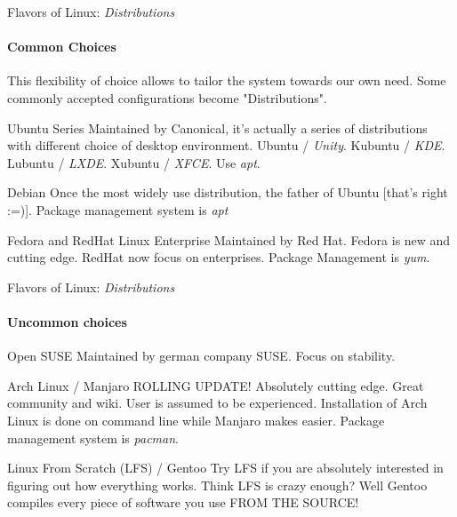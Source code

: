 \begin{frame}{Flavors of Linux: \textit{Distributions}}
\framesubtitle{Common Choices}
\begin{small}
	This flexibility of choice allows to tailor the system towards our own need. Some commonly accepted configurations become "Distributions".
\end{small} 
\begin{block}{Ubuntu Series}
	Maintained by Canonical, it's actually a series of distributions with different choice of desktop environment. Ubuntu / \textit{Unity}. Kubuntu / \textit{KDE}. Lubuntu / \textit{LXDE}. Xubuntu / \textit{XFCE}. Use \textit{apt}.
\end{block}
\begin{block}{Debian}
	Once the most widely use distribution, the father of Ubuntu [that's right :=)]. Package management system is \textit{apt}
\end{block}
\begin{block}{Fedora and RedHat Linux Enterprise}
	Maintained by Red Hat. Fedora is new and cutting edge. RedHat now focus on enterprises. Package Management is \textit{yum}.
\end{block}
\end{frame}

\begin{frame}{Flavors of Linux: \textit{Distributions}}
\framesubtitle{Uncommon choices}
\begin{block}{Open SUSE}
	Maintained by german company SUSE. Focus on stability. 
\end{block}
\begin{block}{Arch Linux / Manjaro}
	ROLLING UPDATE! Absolutely cutting edge. Great community and wiki. User is assumed to be experienced. Installation of Arch Linux is done on command line while Manjaro makes easier. Package management system is \textit{pacman}.
\end{block}
\begin{block}{Linux From Scratch (LFS) / Gentoo}
	Try LFS if you are absolutely interested in figuring out how everything works. Think LFS is crazy enough? Well Gentoo compiles every piece of software you use FROM THE SOURCE! 
\end{block}
\end{frame}

